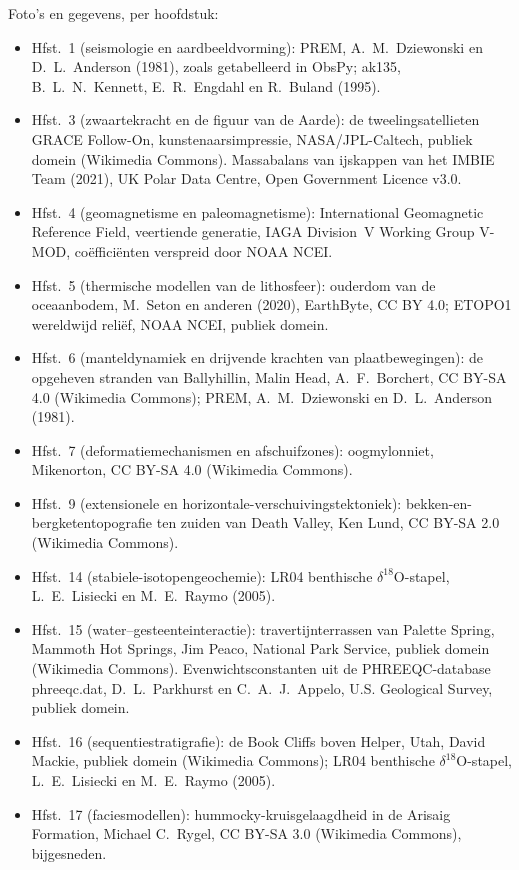 \bigskip
\noindent Foto's en gegevens, per hoofdstuk:
\begin{itemize}\small
  \item Hfst.~1 (seismologie en aardbeeldvorming): PREM, A.~M.~Dziewonski en D.~L.~Anderson (1981), zoals getabelleerd in ObsPy; ak135, B.~L.~N.~Kennett, E.~R.~Engdahl en R.~Buland (1995).
  \item Hfst.~3 (zwaartekracht en de figuur van de Aarde): de tweelingsatellieten GRACE Follow-On, kunstenaarsimpressie, NASA/JPL-Caltech, publiek domein (Wikimedia Commons). Massabalans van ijskappen van het IMBIE Team (2021), UK Polar Data Centre, Open Government Licence v3.0.
  \item Hfst.~4 (geomagnetisme en paleomagnetisme): International Geomagnetic Reference Field, veertiende generatie, IAGA Division~V Working Group V-MOD, coëfficiënten verspreid door NOAA NCEI.
  \item Hfst.~5 (thermische modellen van de lithosfeer): ouderdom van de oceaanbodem, M.~Seton en anderen (2020), EarthByte, CC BY 4.0; ETOPO1 wereldwijd reliëf, NOAA NCEI, publiek domein.
  \item Hfst.~6 (manteldynamiek en drijvende krachten van plaatbewegingen): de opgeheven stranden van Ballyhillin, Malin Head, A.~F.~Borchert, CC BY-SA 4.0 (Wikimedia Commons); PREM, A.~M.~Dziewonski en D.~L.~Anderson (1981).
  \item Hfst.~7 (deformatiemechanismen en afschuifzones): oogmylonniet, Mikenorton, CC BY-SA 4.0 (Wikimedia Commons).
  \item Hfst.~9 (extensionele en horizontale-verschuivingstektoniek): bekken-en-bergketentopografie ten zuiden van Death Valley, Ken Lund, CC BY-SA 2.0 (Wikimedia Commons).
  \item Hfst.~14 (stabiele-isotopengeochemie): LR04 benthische $\delta^{18}$O-stapel, L.~E.~Lisiecki en M.~E.~Raymo (2005).
  \item Hfst.~15 (water--gesteenteinteractie): travertijnterrassen van Palette Spring, Mammoth Hot Springs, Jim Peaco, National Park Service, publiek domein (Wikimedia Commons). Evenwichtsconstanten uit de PHREEQC-database phreeqc.dat, D.~L.~Parkhurst en C.~A.~J.~Appelo, U.S. Geological Survey, publiek domein.
  \item Hfst.~16 (sequentiestratigrafie): de Book Cliffs boven Helper, Utah, David Mackie, publiek domein (Wikimedia Commons); LR04 benthische $\delta^{18}$O-stapel, L.~E.~Lisiecki en M.~E.~Raymo (2005).
  \item Hfst.~17 (faciesmodellen): hummocky-kruisgelaagdheid in de Arisaig Formation, Michael C.~Rygel, CC BY-SA 3.0 (Wikimedia Commons), bijgesneden.

\end{itemize}

